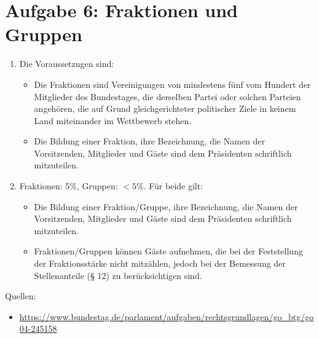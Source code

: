 \documentclass{article}
\begin{document}
	\section*{Aufgabe 6: Fraktionen und Gruppen}
	\begin{enumerate}[label=(\alph*)]
		\item Die Voraussetzngen sind:
		\begin{itemize}
			\item Die Fraktionen sind Vereinigungen von mindestens fünf vom Hundert der Mitglieder des Bundestages, die derselben Partei oder solchen Parteien angehören, die auf Grund gleichgerichteter politischer Ziele in keinem Land miteinander im Wettbewerb stehen.
			\item Die Bildung einer Fraktion, ihre Bezeichnung, die Namen der Vorsitzenden, Mitglieder und Gäste sind dem Präsidenten schriftlich mitzuteilen.
		\end{itemize}
		\item Fraktionen: 5\%, Gruppen: $< 5\%$. Für beide gilt:
		\begin{itemize}
			\item Die Bildung einer Fraktion/Gruppe, ihre Bezeichnung, die Namen der Vorsitzenden, Mitglieder und Gäste sind dem Präsidenten schriftlich mitzuteilen.
			\item Fraktionen/Gruppen können Gäste aufnehmen, die bei der Feststellung der Fraktionsstärke nicht mitzählen, jedoch bei der Bemessung der Stellenanteile (§ 12) zu berücksichtigen sind.
		\end{itemize}
	\end{enumerate}

	Quellen:
	\begin{itemize}
		\item \url{https://www.bundestag.de/parlament/aufgaben/rechtsgrundlagen/go_btg/go04-245158}
	\end{itemize}
\end{document}
